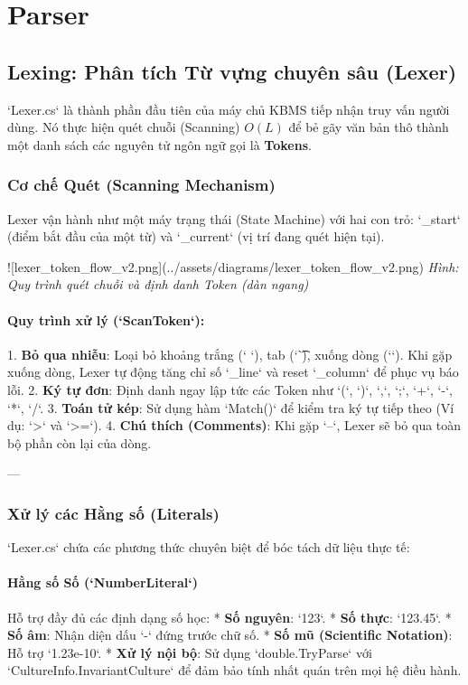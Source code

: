 \chapter{Parser}
\section{Lexing: Phân tích Từ vựng chuyên sâu (Lexer)}

`Lexer.cs` là thành phần đầu tiên của máy chủ KBMS tiếp nhận truy vấn người dùng. Nó thực hiện quét chuỗi (Scanning) $O(L)$ để bẻ gãy văn bản thô thành một danh sách các nguyên tử ngôn ngữ gọi là \textbf{Tokens}.

\subsection{Cơ chế Quét (Scanning Mechanism)}

Lexer vận hành như một máy trạng thái (State Machine) với hai con trỏ: `\_start` (điểm bắt đầu của một từ) và `\_current` (vị trí đang quét hiện tại).

![lexer\_token\_flow\_v2.png](../assets/diagrams/lexer\_token\_flow\_v2.png)
\textit{Hình: Quy trình quét chuỗi và định danh Token (dàn ngang)}

\subsubsection{Quy trình xử lý (`ScanToken`):}
1.  \textbf{Bỏ qua nhiễu}: Loại bỏ khoảng trắng (` `), tab (`\t`), xuống dòng (`\n`). Khi gặp xuống dòng, Lexer tự động tăng chỉ số `\_line` và reset `\_column` để phục vụ báo lỗi.
2.  \textbf{Ký tự đơn}: Định danh ngay lập tức các Token như `(`, `)`, `,`, `;`, `+`, `-`, `*`, `/`.
3.  \textbf{Toán tử kép}: Sử dụng hàm `Match()` để kiểm tra ký tự tiếp theo (Ví dụ: `>` và `>=`).
4.  \textbf{Chú thích (Comments)}: Khi gặp `--`, Lexer sẽ bỏ qua toàn bộ phần còn lại của dòng.

---

\subsection{Xử lý các Hằng số (Literals)}

`Lexer.cs` chứa các phương thức chuyên biệt để bóc tách dữ liệu thực tế:

\subsubsection{Hằng số Số (`NumberLiteral`)}
Hỗ trợ đầy đủ các định dạng số học:
*   \textbf{Số nguyên}: `123`.
*   \textbf{Số thực}: `123.45`.
*   \textbf{Số âm}: Nhận diện dấu `-` đứng trước chữ số.
*   \textbf{Số mũ (Scientific Notation)}: Hỗ trợ `1.23e-10`.
*   \textbf{Xử lý nội bộ}: Sử dụng `double.TryParse` với `CultureInfo.InvariantCulture` để đảm bảo tính nhất quán trên mọi hệ điều hành.

